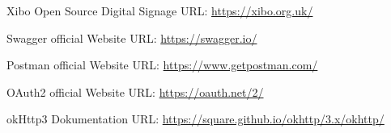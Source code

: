 \begin{thebibliography}{9}

Xibo Open Source Digital Signage
\newblock URL: {\small \url{https://xibo.org.uk/}}

Swagger official Website
\newblock URL: {\small \url{https://swagger.io/}}

Postman official Website
\newblock URL: {\small \url{https://www.getpostman.com/}}

OAuth2 official Website
\newblock URL: {\small \url{https://oauth.net/2/}}

okHttp3 Dokumentation
\newblock URL: {\small \url{https://square.github.io/okhttp/3.x/okhttp/}}

\end{thebibliography}